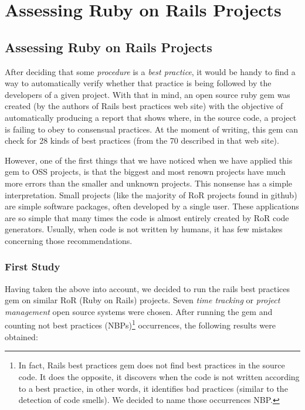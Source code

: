 \thispagestyle{empty}
\chapter{Assessing Ruby on Rails Projects}\label{chap:assissing_ror}


\section{Assessing Ruby on Rails Projects} \label{sec:assessing_ror}
After deciding that some \emph{procedure} is a \emph{best practice},
it would be handy to find a way to automatically verify whether that practice is being followed by
the developers of a given project.
With that in mind, an open source ruby gem was created (by the authors of Rails best practices web site) 
with the objective of automatically producing a report that shows where,
in the source code,  a project is failing to obey to consensual practices.
At the moment of writing, this gem can check for 28 kinds of best practices (from the 70 described in that web site).

However, one of the first things that we have noticed when we have applied this gem to OSS projects,
is that the biggest and most renown projects have much more errors than the smaller and unknown projects.
This nonsense has a simple  interpretation.
Small projects (like the majority of RoR projects found in github) are simple software packages,  often 
developed by a single user.
These applications are so simple that many times the code is almost entirely created by RoR code generators.
Usually, when code is not written by humans, it has few mistakes concerning those recommendations.

\subsection{First Study}\label{subsec:first_study}
Having taken the above into account, we decided to run the rails best practices gem on similar RoR (Ruby on Rails) projects.
Seven \emph{time tracking} or \emph{project management} open source systems were chosen.
After running the gem and counting
\textsf{not best practices (NBPs)}\footnote{In fact, Rails best practices gem does not find best practices in the source code.
  It does the opposite, it discovers when the code is not written according to a best practice, in other words, 
  it identifies bad practices (similar to the detection of code smells).
  We decided to name those occurrences NBP.
}
occurrences, the following results were obtained:

